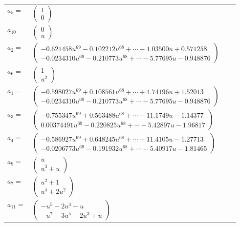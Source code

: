 \documentclass[1p]{elsarticle_modified}
\theoremstyle{definition}
\begin{document}
\begin{tabular}{m{7pt} m{180pt} m{7pt} m{180pt} }
\flushright $a_{5}=$&$\begin{pmatrix}1\\0\end{pmatrix}$ \\
\flushright $a_{10}=$&$\begin{pmatrix}0\\u\end{pmatrix}$ \\
\flushright $a_{2}=$&$\begin{pmatrix}-0.621458 u^{69}-0.102212 u^{68}+\cdots-1.03500 u+0.571258\\-0.0234310 u^{69}-0.210773 u^{68}+\cdots-5.77695 u-0.948876\end{pmatrix}$ \\
\flushright $a_{6}=$&$\begin{pmatrix}1\\u^2\end{pmatrix}$ \\
\flushright $a_{1}=$&$\begin{pmatrix}-0.598027 u^{69}+0.108561 u^{68}+\cdots+4.74196 u+1.52013\\-0.0234310 u^{69}-0.210773 u^{68}+\cdots-5.77695 u-0.948876\end{pmatrix}$ \\
\flushright $a_{3}=$&$\begin{pmatrix}-0.755347 u^{69}+0.563488 u^{68}+\cdots-11.1749 u-1.14377\\0.00374491 u^{69}-0.220825 u^{68}+\cdots-5.42897 u-1.96817\end{pmatrix}$ \\
\flushright $a_{4}=$&$\begin{pmatrix}-0.586927 u^{69}+0.648245 u^{68}+\cdots-11.4105 u-1.27713\\-0.0206773 u^{69}-0.191932 u^{68}+\cdots-5.40917 u-1.81465\end{pmatrix}$ \\
\flushright $a_{9}=$&$\begin{pmatrix}u\\u^3+u\end{pmatrix}$ \\
\flushright $a_{7}=$&$\begin{pmatrix}u^2+1\\u^4+2 u^2\end{pmatrix}$ \\
\flushright $a_{11}=$&$\begin{pmatrix}- u^5-2 u^3- u\\- u^7-3 u^5-2 u^3+u\end{pmatrix}$ \\

\end{tabular}
\end{document}
